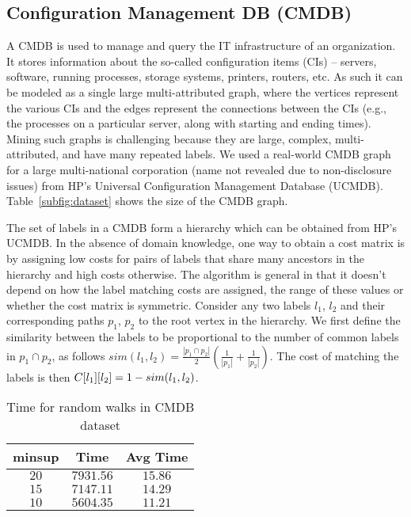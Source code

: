 \subsection{Configuration Management DB (CMDB)} 

A CMDB is used to manage and query the IT infrastructure of an
organization. It stores information about the so-called configuration
items (CIs) -- servers, software, running processes, storage systems,
printers, routers, etc. As such it can be modeled as a single large
multi-attributed graph, where the vertices represent the various CIs and
the edges represent the connections between the CIs (e.g., the processes
on a particular server, along with starting and ending times).  Mining
such graphs is challenging because they are large, complex,
multi-attributed, and have many repeated labels.  We used a real-world
CMDB graph for a large multi-national corporation (name not revealed due
to non-disclosure issues) from HP's Universal Configuration Management
Database (UCMDB).  Table~\ref{subfig:dataset} shows the size of the CMDB
graph. 


\smallskip{} The set of labels in a CMDB
form a hierarchy which can be obtained from HP's UCMDB. In the absence
of domain knowledge, one way to obtain a cost matrix is by assigning low
costs for pairs of labels that share many ancestors in the hierarchy and
high costs otherwise. The algorithm is general in that it doesn't depend
on how the label matching costs are assigned, the range of these values
or whether the cost matrix is symmetric.  Consider any two labels $l_1$,
$l_2$ and their corresponding paths $p_1$, $p_2$ to the root vertex in
the hierarchy.  We first define the similarity between the labels to be
proportional to the number of common labels in $p_1 \cap p_2$, as
follows
$sim(l_1,l_2) =  \frac{|p_1 \cap p_2|}{2}
  \left(\frac{1}{|p_1|} + \frac{1}{|p_2|}\right)$.
The cost of matching the labels is then 
${C}[l_1][l_2] = 1 - sim(l_1,l_2)$.

\begin{table}[!h]
\centering
\begin{tabular}{|c|c|c|}
        \hline
        minsup & Time & Avg Time \\
		\hline
        $20$ & $7931.56$ & $15.86$\\
        $15$ & $7147.11$ & $14.29$\\
        $10$ & $5604.35$ & $11.21$\\
		\hline
    \end{tabular}
    \caption{Time for random walks in CMDB dataset}
\label{tab:ge}
\end{table}



